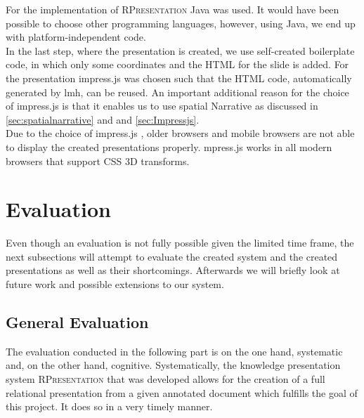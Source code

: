 \documentclass[twoside, 12pt]{article}
\newcommand{\sys}{\textsc{RPresentation}\xspace}
\begin{document}
For the implementation of  \sys Java was used. It would have been possible to choose other programming languages, however, using Java, we end up with platform-independent code.\\

In the last step, where the presentation is created, we use self-created boilerplate code, in which only some coordinates and the HTML for the slide is added. For the presentation impress.js was chosen such that the HTML code, automatically generated by lmh, can be reused. An important additional reason for the choice of impress.js is that it enables us to use spatial Narrative as discussed in \autoref{sec:spatialnarrative} and and \autoref{sec:Impressjs}.\\

Due to the choice of impress.js \cite{JSImpress:npentrel14}, older browsers and mobile browsers are not able to display the created presentations properly. mpress.js works in all modern browsers that support CSS 3D transforms.

\section{Evaluation}
\label{sec:evalcriteria}

Even though an evaluation is not fully possible given the limited time frame, the next subsections will attempt to evaluate the created system and the created presentations as well as their shortcomings. Afterwards we will briefly look at future work and possible extensions to our system.

\subsection{General Evaluation}

The evaluation conducted in the following part is on the one hand, systematic and, on the other hand, cognitive. Systematically, the knowledge presentation system \sys that was developed allows for the creation of a full relational presentation from a given annotated document which fulfills the goal of this project. It does so in a very timely manner.

\end{document}
